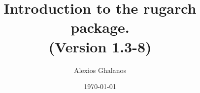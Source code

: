 \documentclass[11pt,a4paper]{article}
\begin{document}

\title{Introduction to the rugarch package.\\
(Version 1.3-8)}
\author{Alexios Ghalanos}
\date{\today}
\maketitle
\tableofcontents
\newpage

\clearpage

\end{document}
